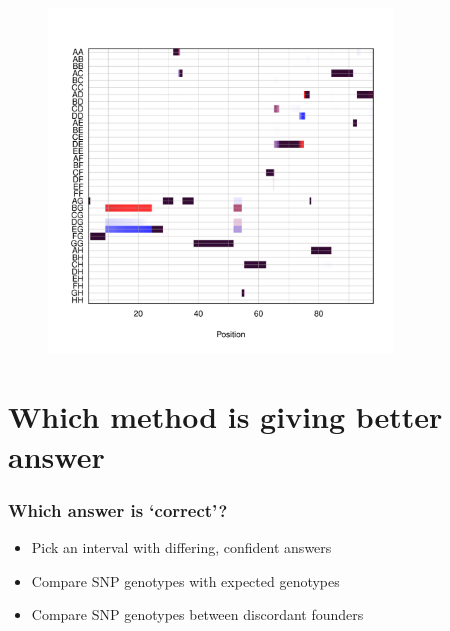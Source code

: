 \documentclass[12pt,t]{beamer}
\begin{document}
	
	\begin{frame}
		\begin{figure}
			{\includegraphics[height=3.6in, width=3.6in]{figures/probs_compare_171.pdf}} 
		\end{figure}	
	\end{frame}


\section{Which method is giving better answer}

	\begin{frame}
		\vspace{0.3in}
		\frametitle{Which answer is `correct'?}
			\begin{itemize}
				\pause \item Pick an interval with differing, confident answers  \\
				\pause \item Compare SNP genotypes with expected genotypes \\
				\pause \item Compare SNP genotypes between discordant founders \\
			\end{itemize}
	\end{frame}
	
\end{document}

